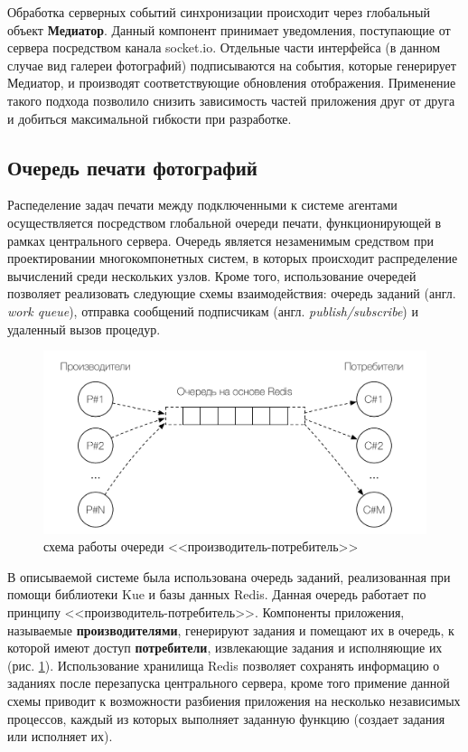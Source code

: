 \documentclass[a4paper,14pt,href]{article}
\begin{document}
Обработка серверных событий синхронизации происходит через глобальный объект \textbf{Медиатор}\cite{MediatorPattern}.
Данный компонент принимает уведомления, поступающие от сервера посредством канала socket.io. Отдельные части интерфейса
(в данном случае вид галереи фотографий) подписываются на события, которые генерирует Медиатор, и производят
соответствующие обновления отображения. Применение такого подхода позволило снизить зависимость частей приложения друг
от друга и добиться максимальной гибкости при разработке.

\subsection{Очередь печати фотографий}
Распеделение задач печати между подключенными к системе агентами осуществляется посредством глобальной очереди печати,
функционирующей в рамках центрального сервера. Очередь является незаменимым средством при проектировании многокомпонетных
систем, в которых происходит распределение вычислений среди нескольких узлов. Кроме того, использование очередей позволяет
реализовать следующие схемы взаимодействия: очередь заданий (англ. \textit{work queue}), отправка сообщений
подписчикам\cite{RabbitMQ} (англ. \textit{publish/subscribe}) и удаленный вызов про\-це\-дур\cite{DistributiveSystems}.


\begin{figure}[htbp]
\begin{center}
  \includegraphics[scale=0.8]{producer-consumer.pdf}
    \caption{схема работы очереди <<производитель-потребитель>>}
    \label{fig:ProducerConsumer}
\end{center}
\end{figure}


В описываемой системе была использована очередь заданий, реализованная при помощи библиотеки Kue\cite{Kue} и базы данных
Redis. Данная очередь работает по принципу <<производитель-потребитель>>. Компоненты приложения, называемые
\textbf{производителями}, генерируют задания и помещают их в очередь, к которой имеют доступ \textbf{потребители},
извлекающие задания и исполняющие их (рис. \ref{fig:ProducerConsumer}). Использование хранилища Redis позволяет
сохранять информацию о заданиях после перезапуска центрального сервера, кроме того примение данной схемы приводит к
возможности разбиения приложения на несколько независимых процессов, каждый из которых выполняет заданную функцию
(создает задания или исполняет их).
\end{document}

